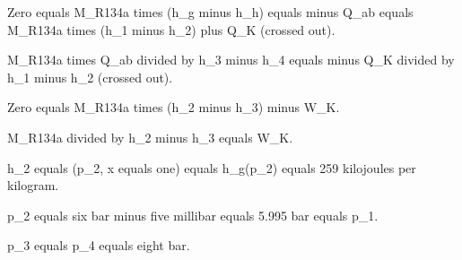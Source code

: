 Zero equals M_R134a times (h_g minus h_h) equals minus Q_ab equals M_R134a times (h_1 minus h_2) plus Q_K (crossed out).

M_R134a times Q_ab divided by h_3 minus h_4 equals minus Q_K divided by h_1 minus h_2 (crossed out).

Zero equals M_R134a times (h_2 minus h_3) minus W_K.

M_R134a divided by h_2 minus h_3 equals W_K.

h_2 equals (p_2, x equals one) equals h_g(p_2) equals 259 kilojoules per kilogram.

p_2 equals six bar minus five millibar equals 5.995 bar equals p_1.

p_3 equals p_4 equals eight bar.
